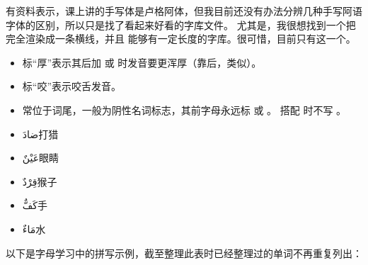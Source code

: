 \begin{note}
    有资料表示，课上讲的手写体是卢格阿体，但我目前还没有办法分辨几种手写阿语字体的区别，所以只是找了看起来好看的字库文件。
    尤其是，我很想找到一个把 完全渲染成一条横线，并且 能够有一定长度的字库。很可惜，目前只有这一个。
\end{note}

\begin{itemize}
    \item 标``厚''表示其后加  或  时发音要更浑厚（靠后，类似\textipa{[A]}）。
    \item 标``咬''表示咬舌发音。
    \item {} 常位于词尾，一般为阴性名词标志，其前字母永远标  或  。 搭配  时不写 。
    \item \ac{ضادَ}{打猎}
    \item \ac{عَيْنٌ}{眼睛} 
    \item \ac{قِرْدٌ}{猴子}
    \item \ac{كَفٌّ}{手}
    \item \ac{مَاءٌ}{水}
\end{itemize}

以下是字母学习中的拼写示例，截至整理此表时已经整理过的单词不再重复列出：

